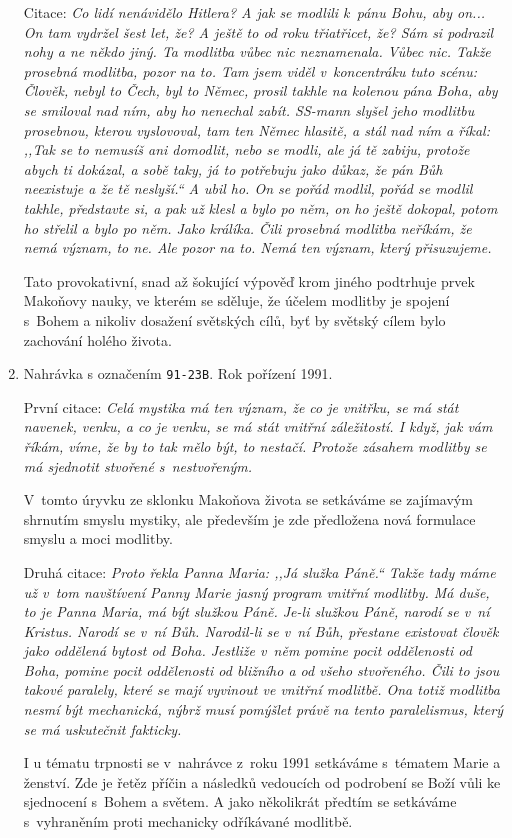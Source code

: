 \begin{enumerate}
{    Citace: \textit{%
      Co lidí nenávidělo Hitlera? A jak se modlili k~pánu Bohu, aby on... On tam
      vydržel šest let, že? A ještě to od roku třiatřicet, že? Sám si podrazil
      nohy a ne někdo jiný. Ta modlitba vůbec nic neznamenala. Vůbec nic. Takže
      prosebná modlitba, pozor na to. Tam jsem viděl v~koncentráku tuto scénu:
      Člověk, nebyl to Čech, byl to Němec, prosil takhle na kolenou pána Boha,
      aby se smiloval nad ním, aby ho nenechal zabít. SS-mann slyšel jeho
      modlitbu prosebnou, kterou vyslovoval, tam ten Němec hlasitě, a stál nad
      ním a říkal: ,,Tak se to nemusíš ani domodlit, nebo se modli, ale já tě
      zabiju, protože abych ti dokázal, a sobě taky, já to potřebuju jako důkaz,
      že pán Bůh neexistuje a že tě neslyší.`` A ubil ho. On se pořád modlil,
      pořád se modlil takhle, představte si, a pak už klesl a bylo po něm, on ho
      ještě dokopal, potom ho střelil a bylo po něm. Jako králíka. Čili prosebná
      modlitba neříkám, že nemá význam, to ne. Ale pozor na to. Nemá ten význam,
      který přisuzujeme.
    }

    Tato provokativní, snad až šokující výpověď krom jiného podtrhuje prvek
    Makoňovy nauky, ve kterém se sděluje, že účelem modlitby je spojení s~Bohem
    a nikoliv dosažení světských cílů, byť by světský cílem bylo zachování
    holého života.
  }
  \item{
    Nahrávka s označením \texttt{91-23B}.
    Rok pořízení 1991.

    První citace: \textit{%
      Celá mystika má ten význam, že co je vnitřku, se má stát navenek, venku, a
      co je venku, se má stát vnitřní záležitostí. I když, jak vám říkám, víme,
      že by to tak mělo být, to nestačí. Protože zásahem modlitby se má
      sjednotit stvořené s~nestvořeným.
    }

    V~tomto úryvku ze sklonku Makoňova života se setkáváme se zajímavým shrnutím
    smyslu mystiky, ale především je zde předložena nová formulace smyslu a moci
    modlitby.

    Druhá citace: \textit{%
      Proto řekla Panna Maria: ,,Já služka Páně.`` Takže tady máme už v~tom
      navštívení Panny Marie jasný program vnitřní modlitby. Má duše, to je
      Panna Maria, má být služkou Páně. Je-li služkou Páně, narodí se v~ní
      Kristus. Narodí se v~ní Bůh. Narodil-li se v~ní Bůh, přestane existovat
      člověk jako oddělená bytost od Boha. Jestliže v~něm pomine pocit
      oddělenosti od Boha, pomine pocit oddělenosti od bližního a od všeho
      stvořeného. Čili to jsou takové paralely, které se mají vyvinout ve
      vnitřní modlitbě. Ona totiž modlitba nesmí být mechanická, nýbrž musí
      pomýšlet právě na tento paralelismus, který se má uskutečnit fakticky.
    }

    I u tématu trpnosti se v~nahrávce z~roku 1991 setkáváme s~tématem Marie a
    ženství. Zde je řetěz příčin a následků vedoucích od podrobení se Boží vůli
    ke sjednocení s~Bohem a světem. A jako několikrát předtím se setkáváme
    s~vyhraněním proti mechanicky odříkávané modlitbě.
  }
\end{enumerate}

